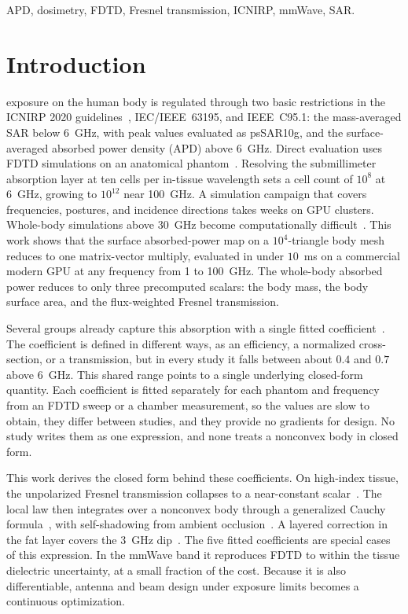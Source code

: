 \documentclass[journal,twocolumn,10pt]{IEEEtran}
\theoremstyle{plain}
\begin{document}
\begin{IEEEkeywords}
APD, dosimetry, FDTD, Fresnel transmission, ICNIRP, mmWave, SAR.
\end{IEEEkeywords}

\IEEEpeerreviewmaketitle

\section{Introduction}\label{sec:introduction}

 exposure on the human body is regulated
through two basic restrictions in the \gls{ICNIRP} 2020
guidelines~\cite{ICNIRP2020}, IEC/IEEE~63195, and IEEE~C95.1: the
mass-averaged \gls{SAR} below 6~GHz, with peak values evaluated as
\gls{psSAR10g}, and the surface-averaged absorbed power density
(\gls{APD}) above 6~GHz. Direct evaluation uses
\gls{FDTD} simulations on an anatomical
phantom~\cite{Kodera2024,Diao2024,Hirata2021,Wydaeghe2026}. Resolving the submillimeter
absorption layer at ten cells per in-tissue wavelength
sets a cell count of $10^{8}$ at 6~GHz, growing to $10^{12}$ near
100~GHz. A simulation campaign that covers frequencies, postures, and
incidence directions takes weeks on \gls{GPU} clusters. Whole-body
simulations above 30~GHz become computationally difficult~\cite{Wydaeghe2026}.
This work shows that the surface absorbed-power map on a
$10^4$-triangle body mesh reduces to one matrix-vector multiply,
evaluated in under $10$~ms on a commercial modern GPU at any
frequency from 1 to 100~GHz. The whole-body absorbed power
reduces to only three precomputed scalars: the body mass, the
body surface area, and the flux-weighted Fresnel transmission.

Several groups already capture this absorption with a single fitted
coefficient~\cite{Bamba2014,Flintoft2014,Zhang2017thesis,ZhangRobinson2020,Kodera2024,Diao2024}.
The coefficient is defined in different ways, as an efficiency, a
normalized cross-section, or a transmission, but in every study it
falls between about $0.4$ and $0.7$ above $6$~GHz. This shared range
points to a single underlying closed-form quantity. Each coefficient
is fitted separately for each phantom and frequency from an \gls{FDTD}
sweep or a chamber measurement, so the values are slow to obtain, they
differ between studies, and they provide no gradients for design. No
study writes them as one expression, and none treats a nonconvex body
in closed form.

This work derives the closed form behind these coefficients. On
high-index tissue, the unpolarized Fresnel transmission collapses to a
near-constant scalar~\cite{Azzam2015}. The local law then integrates
over a nonconvex body through a generalized Cauchy
formula~\cite{Cauchy1841}, with self-shadowing from ambient
occlusion~\cite{Zhukov1998,Landis2002,AkenineMoller2018}. A layered
correction in the fat layer covers the $3$~GHz dip~\cite{Flintoft2014}.
The five fitted coefficients are special cases of this expression. In
the mmWave band it reproduces \gls{FDTD} to within the tissue
dielectric uncertainty, at a small fraction of the cost. Because it is
also differentiable, antenna and beam design under exposure limits
becomes a continuous optimization.
\end{document}
